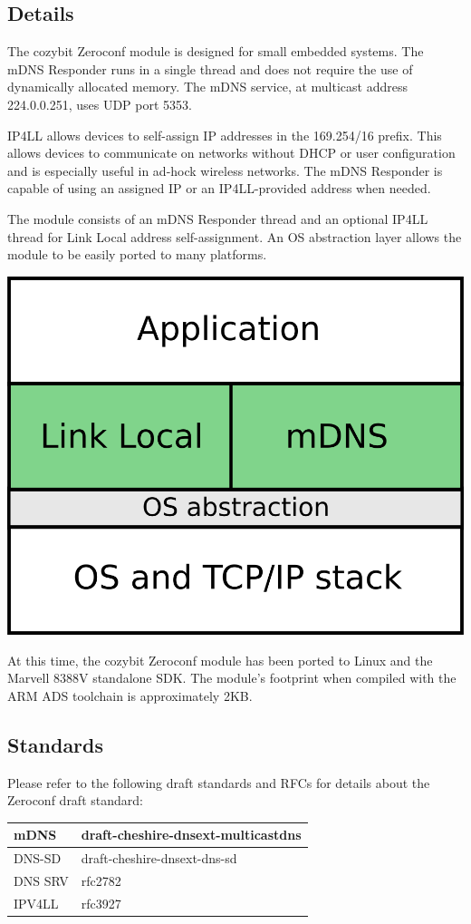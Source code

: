 \documentclass[12pt,landscape,twocolumn]{article}
\begin{document}
\subsection*{Details}

The cozybit Zeroconf module is designed for small embedded systems.  The mDNS 
Responder runs in a single thread and does not require the use of dynamically 
allocated memory.  The mDNS service, at multicast address 224.0.0.251, uses 
UDP port 5353.

IP4LL allows devices to self-assign IP addresses in the 169.254/16 prefix. 
This allows devices to communicate on networks without DHCP or user 
configuration and is especially useful in ad-hock wireless networks.  The mDNS
Responder is capable of using an assigned IP or an IP4LL-provided address when
needed.

The module consists of an mDNS Responder thread and an optional IP4LL thread 
for Link Local address self-assignment.  An OS abstraction layer allows the 
module to be easily ported to many platforms.

\begin{center}
\includegraphics[width=40ex]{./figures/arch.png}
\end{center}

At this time, the cozybit Zeroconf module has been ported to Linux and the 
Marvell 8388V standalone SDK.  The module's footprint when compiled with the
ARM ADS toolchain is approximately 2KB.

\pagebreak
\subsection*{Standards}

Please refer to the following draft standards and RFCs for details about the
Zeroconf draft standard:

\vspace{1ex}
\begin{tabular}{|l|l|}
\hline
mDNS & draft-cheshire-dnsext-multicastdns \\
\hline
DNS-SD & draft-cheshire-dnsext-dns-sd \\
\hline
DNS SRV & rfc2782 \\
\hline
IPV4LL & rfc3927 \\
\hline
\end{tabular}
\end{document}
